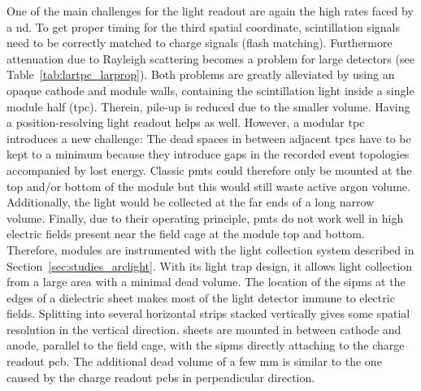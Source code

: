 One of the main challenges for the light readout are again the high rates faced by a \gls{nd}.
To get proper timing for the third spatial coordinate, scintillation signals need to be correctly matched to charge signals (flash matching).
Furthermore attenuation due to Rayleigh scattering becomes a problem for large detectors (see Table~\ref{tab:lartpc_larprop}).
Both problems are greatly alleviated by using an opaque cathode and module walls, containing the scintillation light inside a single module half (\gls{tpc}).
Therein, pile-up is reduced due to the smaller volume.
Having a position-resolving light readout helps as well.
However, a modular \gls{tpc} introduces a new challenge: The dead spaces in between adjacent \glspl{tpc} have to be kept to a minimum because they introduce gaps in the recorded event topologies accompanied by lost energy.
Classic \glspl{pmt} could therefore only be mounted at the top and/or bottom of the module but this would still waste active argon volume.
Additionally, the light would be collected at the far ends of a long narrow volume.
Finally, due to their operating principle, \glspl{pmt} do not work well in high electric fields present near the field cage at the module top and bottom.
Therefore, \AC{} modules are instrumented with the \AL{} light collection system described in Section~\ref{sec:studies_arclight}.
With its light trap design, it  allows light collection from a large area with a minimal dead volume.
The location of the \glspl{sipm} at the edges of a dielectric sheet makes most of the light detector immune to electric fields.
Splitting \AL{} into several horizontal strips stacked vertically gives some spatial resolution in the vertical direction.
\AL{} sheets are mounted in between cathode and anode, parallel to the field cage, with the \glspl{sipm} directly attaching to the charge readout \gls{pcb}.
The additional dead volume of a few \si{\milli\metre} is similar to the one caused by the charge readout \glspl{pcb} in perpendicular direction.